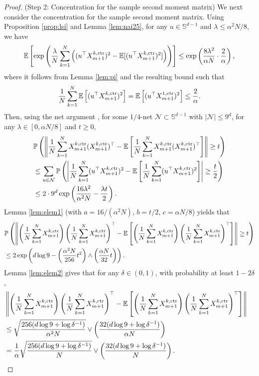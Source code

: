 \documentclass[12pt,reqno]{amsart}
\theoremstyle{remark}
\theoremstyle{definition}
\newcommand{\bbS}{\mathbb{S}}
\newcommand{\calN}{\mathcal{N}}
\newcommand{\E}{\mathbb{E}}
\renewcommand{\Pr}{\mathbb{P}}
\newcommand{\ctr}{\textnormal{ctr}}
\begin{document}
\begin{proof}
    (Step 2: Concentration for the sample second moment matrix) We next consider the concentration for the sample second moment matrix.
    Using Proposition \ref{prop:lsi} and Lemma \ref{lem:nai25}, for any $u\in\bbS^{d-1}$ and $\lambda\le \alpha^{2}N/8$, we have
    \begin{equation*}
        \E\left[\exp\left(\frac{\lambda}{N}\sum_{k=1}^{N}\left((u^{\top}X_{m+1}^{k,\ctr})^{2}-\E[(u^{\top}X_{m+1}^{k,\ctr})^{2}]\right)\right)\right]\le \exp\left(\frac{8\lambda^{2}}{\alpha N}\cdot\frac{2}{\alpha}\right),
    \end{equation*}
    where it follows from Lemma \ref{lem:pi} and the resulting bound such that
    \begin{equation*}
        \frac{1}{N}\sum_{k=1}^{N}\E\left[(u^{\top}X_{m+1}^{k,\ctr})^{2}\right]=\E\left[(u^{\top}X_{m+1}^{1,\ctr})^{2}\right]\le \frac{2}{\alpha}.
    \end{equation*}
    Then, using the net argument \citep{vershynin2018high}, for some $1/4$-net $\calN\subset\bbS^{d-1}$ with $|\calN|\le 9^{d}$, for any $\lambda\in[0,\alpha N/8]$ and $t\ge0$,
    \begin{align*}
        &\Pr\left(\left\|\frac{1}{N}\sum_{k=1}^{N}X_{m+1}^{k,\ctr}(X_{m+1}^{k,\ctr})^{\top}-\E\left[\frac{1}{N}\sum_{k=1}^{N}X_{m+1}^{k,\ctr}(X_{m+1}^{k,\ctr})^{\top}\right]\right\|\ge t\right)\\
        &\le \sum_{u\in\calN}\Pr\left(\left|\frac{1}{N}\sum_{k=1}^{N}(u^{\top}X_{m+1}^{k,\ctr})^{2}-\E\left[\frac{1}{N}\sum_{k=1}^{N}(u^{\top}X_{m+1}^{k,\ctr})^{2}\right]\right|\ge \frac{t}{2}\right)\\
        &\le 2\cdot 9^{d}\exp\left(\frac{16\lambda^{2}}{\alpha^{2} N}-\frac{\lambda t}{2}\right).
    \end{align*}
    Lemma \ref{lem:elem1} (with $a=16/(\alpha^{2}N)$, $b=t/2$, $c=\alpha N/8$) yields that
    \begin{align*}
        &\Pr\left(\left\|\left(\frac{1}{N}\sum_{k=1}^{N}X_{m+1}^{k,\ctr}\right)\left(\frac{1}{N}\sum_{k=1}^{N}X_{m+1}^{k,\ctr}\right)^{\top}-\E\left[\left(\frac{1}{N}\sum_{k=1}^{N}X_{m+1}^{k,\ctr}\right)\left(\frac{1}{N}\sum_{k=1}^{N}X_{m+1}^{k,\ctr}\right)^{\top}\right]\right\|\ge t\right)\\
        &\le 2\exp\left(d\log 9-\left(\frac{\alpha^{2}N}{256}t^{2}\right)\wedge \left(\frac{\alpha N}{32}t\right)\right).
    \end{align*}
    Lemma \ref{lem:elem2} gives that for any $\delta\in(0,1)$, with probability at least $1-2\delta$,
    \begin{align*}
        &\left\|\left(\frac{1}{N}\sum_{k=1}^{N}X_{m+1}^{k,\ctr}\right)\left(\frac{1}{N}\sum_{k=1}^{N}X_{m+1}^{k,\ctr}\right)^{\top}-\E\left[\left(\frac{1}{N}\sum_{k=1}^{N}X_{m+1}^{k,\ctr}\right)\left(\frac{1}{N}\sum_{k=1}^{N}X_{m+1}^{k,\ctr}\right)^{\top}\right]\right\|&\\
        &\le \sqrt{\frac{256(d\log9+\log\delta^{-1})}{\alpha^{2}N}}\vee \left(\frac{32(d\log9+\log\delta^{-1})}{\alpha N}\right)\\
        &=\frac{1}{\alpha}\sqrt{\frac{256(d\log9+\log\delta^{-1})}{N}}\vee \left(\frac{32(d\log9+\log\delta^{-1})}{N}\right).
    \end{align*}


\end{proof}
\end{document}

